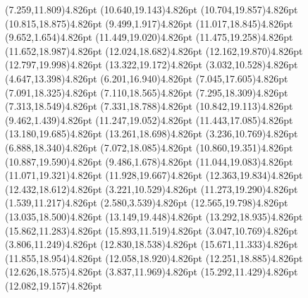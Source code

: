\documentclass[10pt]{article}
\begin{document}
{{\qdisk(7.259,11.809){4.826pt}%
\qdisk(10.640,19.143){4.826pt}%
\qdisk(10.704,19.857){4.826pt}%
\qdisk(10.815,18.875){4.826pt}%
\qdisk(9.499,1.917){4.826pt}%
\qdisk(11.017,18.845){4.826pt}%
\qdisk(9.652,1.654){4.826pt}%
\qdisk(11.449,19.020){4.826pt}%
\qdisk(11.475,19.258){4.826pt}%
\qdisk(11.652,18.987){4.826pt}%
\qdisk(12.024,18.682){4.826pt}%
\qdisk(12.162,19.870){4.826pt}%
\qdisk(12.797,19.998){4.826pt}%
\qdisk(13.322,19.172){4.826pt}%
\dummycolor
\qdisk(3.032,10.528){4.826pt}%
\qdisk(4.647,13.398){4.826pt}%
\qdisk(6.201,16.940){4.826pt}%
\qdisk(7.045,17.605){4.826pt}%
\qdisk(7.091,18.325){4.826pt}%
\qdisk(7.110,18.565){4.826pt}%
\qdisk(7.295,18.309){4.826pt}%
\qdisk(7.313,18.549){4.826pt}%
\qdisk(7.331,18.788){4.826pt}%
\qdisk(10.842,19.113){4.826pt}%
\qdisk(9.462,1.439){4.826pt}%
\qdisk(11.247,19.052){4.826pt}%
\qdisk(11.443,17.085){4.826pt}%
\qdisk(13.180,19.685){4.826pt}%
\qdisk(13.261,18.698){4.826pt}%
\dummycolor
\qdisk(3.236,10.769){4.826pt}%
\qdisk(6.888,18.340){4.826pt}%
\qdisk(7.072,18.085){4.826pt}%
\qdisk(10.860,19.351){4.826pt}%
\qdisk(10.887,19.590){4.826pt}%
\qdisk(9.486,1.678){4.826pt}%
\qdisk(11.044,19.083){4.826pt}%
\qdisk(11.071,19.321){4.826pt}%
\qdisk(11.928,19.667){4.826pt}%
\qdisk(12.363,19.834){4.826pt}%
\qdisk(12.432,18.612){4.826pt}%
\dummycolor
\qdisk(3.221,10.529){4.826pt}%
\qdisk(11.273,19.290){4.826pt}%
\dummycolor
\qdisk(1.539,11.217){4.826pt}%
\qdisk(2.580,3.539){4.826pt}%
\qdisk(12.565,19.798){4.826pt}%
\qdisk(13.035,18.500){4.826pt}%
\qdisk(13.149,19.448){4.826pt}%
\qdisk(13.292,18.935){4.826pt}%
\qdisk(15.862,11.283){4.826pt}%
\qdisk(15.893,11.519){4.826pt}%
\dummycolor
\qdisk(3.047,10.769){4.826pt}%
\qdisk(3.806,11.249){4.826pt}%
\qdisk(12.830,18.538){4.826pt}%
\qdisk(15.671,11.333){4.826pt}%
\dummycolor
\qdisk(11.855,18.954){4.826pt}%
\qdisk(12.058,18.920){4.826pt}%
\qdisk(12.251,18.885){4.826pt}%
\qdisk(12.626,18.575){4.826pt}%
\dummycolor
\qdisk(3.837,11.969){4.826pt}%
\qdisk(15.292,11.429){4.826pt}%
\dummycolor
\qdisk(12.082,19.157){4.826pt}%
}}
\end{document}
